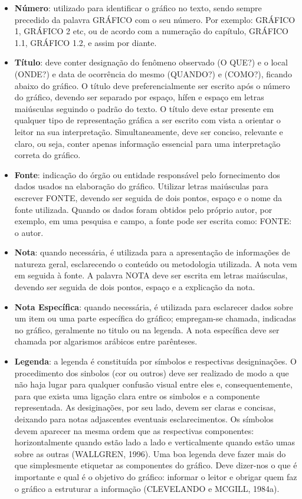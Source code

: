 \begin{itemize}
\item \textbf{Número}: utilizado para identificar o gráfico no
texto, sendo sempre precedido da palavra GRÁFICO com o seu número.
Por exemplo: GRÁFICO 1, GRÁFICO 2 etc, ou de acordo com a
numeração do capítulo, GRÁFICO 1.1, GRÁFICO 1.2, e assim por
diante. \item \textbf{Título}: deve conter designação do fenômeno
observado (O QUE?) e o local (ONDE?) e data de ocorrência do mesmo
(QUANDO?) e (COMO?), ficando abaixo do gráfico. O título deve
preferencialmente ser escrito após o número do gráfico, devendo
ser separado por espaço, hífen e espaço em letras maiúsculas
seguindo o padrão do texto. O título deve estar presente em qualquer tipo de representação gráfica a ser escrito com vista a orientar o leitor na sua interpretação. Simultaneamente, deve ser conciso, relevante e claro, ou seja, conter apenas informação essencial para uma interpretação correta do gráfico. 
\item \textbf{Fonte}: indicação do
órgão ou entidade responsável pelo fornecimento dos dados usados
na elaboração do gráfico. Utilizar letras maiúsculas para escrever
FONTE, devendo ser seguida de dois pontos, espaço e o nome da
fonte utilizada. Quando os dados foram obtidos pelo próprio autor,
por exemplo, em uma pesquisa e campo, a fonte pode ser escrita
como: FONTE: o autor. \item \textbf{Nota}: quando necessária, é
utilizada para a apresentação de informações de natureza geral,
esclarecendo o conteúdo ou metodologia utilizada. A nota vem em
seguida à fonte. A palavra NOTA deve ser escrita em letras
maiúsculas, devendo ser seguida de dois pontos, espaço e a
explicação da nota. \item \textbf{Nota Específica}: quando
necessária, é utilizada para esclarecer dados sobre um item ou uma
parte específica do gráfico; empregam-se chamada, indicadas no
gráfico, geralmente no titulo ou na legenda. A nota específica
deve ser chamada por algarismos arábicos entre parênteses.
\item \textbf{Legenda}: a legenda é constituída por símbolos e respectivas designinações. O procedimento dos sinbolos (cor ou outros) deve ser realizado de modo a que não haja lugar para qualquer confusão visual entre eles e, consequentemente, para que exista uma ligação clara entre os simbolos e a componente representada. As desiginações, por seu lado, devem ser claras e concisas, deixando para notas adjascentes eventuais esclarecimentos. Os símbolos devem aparecer na mesma ordem que as respectivas componentes: horizontalmente quando estão lado a lado e verticalmente quando estão umas sobre as outras (WALLGREN, 1996). Uma boa legenda deve fazer mais do que simplesmente etiquetar as componentes do gráfico. Deve dizer-nos o que é importante e qual é o objetivo do gráfico:   
informar o leitor e obrigar quem faz o gráfico a estruturar a informação (CLEVELANDO e MCGILL, 1984a).\vskip0.3cm


\end{itemize}
